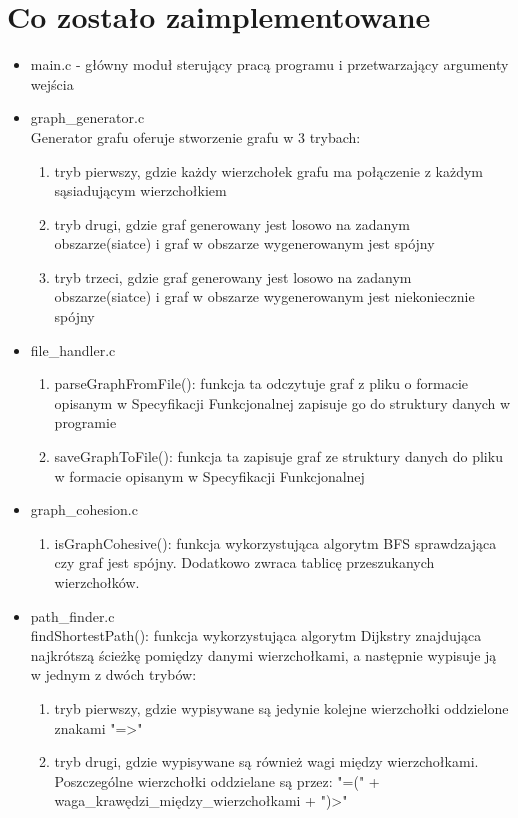\documentclass{article}
\begin{document}
\section{Co zostało zaimplementowane}
\begin{itemize}
    \item main.c - główny moduł sterujący pracą programu i przetwarzający argumenty wejścia
    \item graph\_generator.c \\
    Generator grafu oferuje stworzenie grafu w 3 trybach:
        \begin{enumerate}
            \item tryb pierwszy, gdzie każdy wierzchołek grafu ma połączenie z każdym sąsiadującym wierzchołkiem   
            \item tryb drugi, gdzie graf generowany jest losowo na zadanym obszarze(siatce) i graf w obszarze wygenerowanym jest spójny
            \item tryb trzeci, gdzie graf generowany jest losowo na zadanym obszarze(siatce) i graf w obszarze wygenerowanym jest niekoniecznie spójny
        \end{enumerate}
    \item file\_handler.c
         \begin{enumerate}
            \item parseGraphFromFile(): funkcja ta odczytuje graf z pliku o formacie opisanym w Specyfikacji Funkcjonalnej zapisuje go do struktury danych w programie
            \item saveGraphToFile(): funkcja ta zapisuje graf ze struktury danych do pliku w formacie opisanym w Specyfikacji Funkcjonalnej
        \end{enumerate}
    \item graph\_cohesion.c
         \begin{enumerate}
            \item isGraphCohesive(): funkcja wykorzystująca algorytm BFS sprawdzająca czy graf jest spójny. Dodatkowo zwraca tablicę przeszukanych wierzchołków.
        \end{enumerate}
    \item path\_finder.c \\
    findShortestPath(): funkcja wykorzystująca algorytm Dijkstry znajdująca najkrótszą ścieżkę pomiędzy danymi wierzchołkami, a następnie wypisuje ją w jednym z dwóch trybów:
         \begin{enumerate}
            \item tryb pierwszy, gdzie wypisywane są jedynie kolejne wierzchołki oddzielone znakami "=>"
            \item tryb drugi, gdzie wypisywane są również wagi między wierzchołkami. Poszczególne 
            wierzchołki oddzielane są przez: "=(" + waga\_krawędzi\_między\_wierzchołkami + ")>"
        \end{enumerate}
\end{itemize}
\end{document}
